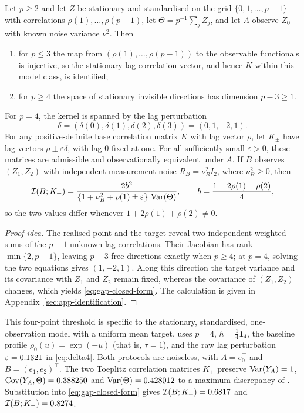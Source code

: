 \begin{theorem}
\label{thm:minimal}
Let $p\ge2$ and let $Z$ be stationary and standardised on the grid
$\{0,1,\dots,p-1\}$ with
correlations $\rho(1),\dots,\rho(p-1)$, let $\Theta=p^{-1}\sum_j Z_j$, and let
$A$ observe $Z_0$ with known noise variance $\nu^2$. Then
\begin{enumerate}[label=(\roman*),leftmargin=2.2em,itemsep=2pt]
\item for $p\le3$ the map from $(\rho(1),\dots,\rho(p-1))$ to the observable
functionals is injective, so the stationary lag-correlation vector, and hence
$K$ within this model class, is identified;
\item for $p\ge4$ the space of stationary invisible directions has dimension
$p-3\ge1$.
\end{enumerate}
For $p=4$, the kernel is spanned by the lag perturbation
\begin{equation}
\delta=(\delta(0),\delta(1),\delta(2),\delta(3))=(0,1,-2,1).
\label{eq:delta4}
\end{equation}
For any positive-definite base correlation matrix $K$ with lag vector $\rho$,
let $K_\pm$ have lag vectors $\rho\pm\varepsilon\delta$, with lag $0$ fixed at
one. For all sufficiently small $\varepsilon>0$, these matrices are admissible
and observationally equivalent under $A$. If $B$ observes $(Z_1,Z_2)$ with
independent measurement noise $R_B=\nu_B^2 I_2$, where $\nu_B^2\ge0$, then
\begin{equation}
\mathcal{I}(B;K_\pm)=\frac{2b^2}{\{1+\nu_B^2+\rho(1)\pm\varepsilon\}\,\operatorname{Var}(\Theta)},
\qquad
b=\frac{1+2\rho(1)+\rho(2)}{4},
\label{eq:gap-closed-form}
\end{equation}
so the two values differ whenever $1+2\rho(1)+\rho(2)\neq0$.
\end{theorem}

\begin{proof}[Proof idea]
The realised point and the target reveal two independent weighted sums of the
$p-1$ unknown lag correlations. Their Jacobian has rank
$\min\{2,p-1\}$, leaving $p-3$ free directions exactly when $p\ge4$; at
$p=4$, solving the two equations gives $(1,-2,1)$. Along this direction the
target variance and its covariance with $Z_1$ and $Z_2$ remain fixed, whereas
the covariance of $(Z_1,Z_2)$ changes, which yields
\eqref{eq:gap-closed-form}. The calculation is given in
Appendix~\ref{sec:app-identification}.
\end{proof}

This four-point threshold is specific to the stationary, standardised,
one-observation model with a uniform mean target. 
uses $p=4$, $h=\tfrac{1}{4}\mathbf{1}_4$, the baseline profile
$\rho_0(u)=\exp(-u)$ (that is, $\tau=1$), and the raw lag perturbation
$\varepsilon=0.1321$ in \eqref{eq:delta4}. Both protocols are noiseless,
with $A=e_0^\top$ and $B=(e_1,e_2)^\top$. The two Toeplitz correlation
matrices $K_\pm$ preserve $\operatorname{Var}(Y_A)=1$,
$\operatorname{Cov}(Y_A,\Theta)=0.388250$ and
$\operatorname{Var}(\Theta)=0.428012$ to a maximum discrepancy of
\numIdDiscrepancy. Substitution into \eqref{eq:gap-closed-form} gives
$\mathcal{I}(B;K_+)=0.6817$ and $\mathcal{I}(B;K_-)=0.8274$.

